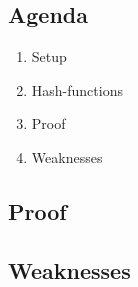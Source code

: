 

\subsection*{Agenda}
\begin{enumerate}
\item Setup
\item Hash-functions
\item Proof
\item Weaknesses
\end{enumerate}



\subsection{Proof}


\subsection{Weaknesses}
